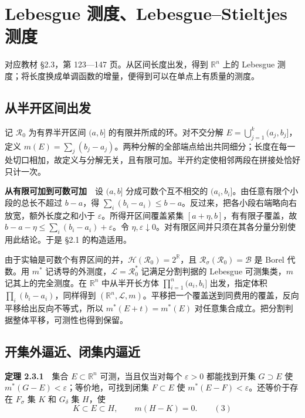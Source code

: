 \documentclass[11pt,a4paper]{article}
\begin{document}
\section{Lebesgue 测度、Lebesgue--Stieltjes 测度}
对应教材 \S{}2.3，第 123---147 页。从区间长度出发，得到 \(\mathbb R^n\) 上的 Lebesgue 测度；将长度换成单调函数的增量，便得到可以在单点上有质量的测度。

\subsection*{从半开区间出发}\label{ux4eceux534aux5f00ux533aux95f4ux51faux53d1}

记 \(\mathcal R_0\) 为有界半开区间 \((a,b]\) 的有限并所成的环。对不交分解 \(E=\bigcup_{j=1}^k(a_j,b_j]\)，定义 \(m(E)=\sum_j(b_j-a_j)\)。两种分解的全部端点给出共同细分；长度在每一处切口相加，故定义与分解无关，且有限可加。半开约定使相邻两段在拼接处恰好只计一次。

\textbf{从有限可加到可数可加}　设 \((a,b]\) 分成可数个互不相交的 \((a_i,b_i]\)。由任意有限个小段的总长不超过 \(b-a\)，得 \(\sum_i(b_i-a_i)\leq b-a\)。反过来，把各小段右端略向右放宽，额外长度之和小于 \(\varepsilon\)。所得开区间覆盖紧集 \([a+\eta,b]\)，有有限子覆盖，故 \(b-a-\eta\leq\sum_i(b_i-a_i)+\varepsilon\)。令 \(\eta,\varepsilon\downarrow0\)。对有限区间并只须在其各分量分别使用此结论。于是 \S{}2.1 的构造适用。

由于实轴是可数个有界区间的并，\(\mathcal H(\mathcal R_0)=2^{\mathbb R}\)，且 \(\mathcal R_\sigma(\mathcal R_0)=\mathcal B\) 是 Borel 代数。用 \(m^*\) 记诱导的外测度，\(\mathcal L=\mathcal R_0^*\) 记满足分割判据的 Lebesgue 可测集类，\(m\) 记其上的完全测度。在 \(\mathbb R^n\) 中从半开长方体 \(\prod_{i=1}^n(a_i,b_i]\) 出发，指定体积 \(\prod_i(b_i-a_i)\)，同样得到 \((\mathbb R^n,\mathcal L,m)\)。平移把一个覆盖送到同费用的覆盖，反向平移给出反向不等式，所以 \(m^*(E+t)=m^*(E)\) 对任意集合成立。把分割判据整体平移，可测性也得到保留。

\subsection*{开集外逼近、闭集内逼近}\label{ux5f00ux96c6ux5916ux903cux8fd1ux95edux96c6ux5185ux903cux8fd1}

\textbf{定理 2.3.1}　集合 \(E\subset\mathbb R^n\) 可测，当且仅当对每个 \(\varepsilon>0\) 都能找到开集 \(G\supset E\) 使 \(m^*(G-E)<\varepsilon\)；等价地，可找到闭集 \(F\subset E\) 使 \(m^*(E-F)<\varepsilon\)。还等价于存在 \(F_\sigma\) 集 \(K\) 和 \(G_\delta\) 集 \(H\)，使 \[
K\subset E\subset H,\qquad m(H-K)=0. \qquad (3)
\]
\end{document}
